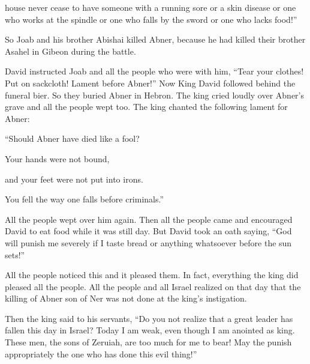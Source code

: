{house
never cease to have someone with
a running sore
or a skin disease
or one who works at the spindle
or one who falls
by the sword
or one who lacks
food!”
\par }{\PP {}So Joab
and his brother
Abishai
killed
Abner,
because
he had
killed
their brother
Asahel
in Gibeon
during the battle.
\par }{\PP {}David
instructed
Joab
and all
the people
who
were with
him, “Tear
your clothes! Put on
sackcloth! Lament
before
Abner!” Now King
David
followed
behind
the funeral bier.
So they buried
Abner
in Hebron.
The king
cried
loudly
over Abner’s
grave
and all
the people
wept too.
The king
chanted
the following lament for Abner:
\par }{\Q “Should Abner
have died
like a fool?
\par }{\Q {}Your hands
were not
bound,
\par }{\Q and your feet
were not
put into irons.
\par }{\Q You fell
the way one falls
before
criminals.”
\par }{\PP All
the people
wept
over him again.
Then all
the people
came
and encouraged
David
to eat food
while it was still
day.
But David
took an oath
saying,
“God
will punish
me severely
if
I taste
bread
or
anything
whatsoever
before
the sun
sets!”
\par }{\PP {}All
the people
noticed
this and it pleased
them. In fact, everything
the king
did
pleased
all
the people.
All
the people
and all
Israel
realized
on that day
that
the killing of Abner
son
of Ner
was not
done at the king’s
instigation.
\par }{\PP {}Then the king
said
to his servants,
“Do you not
realize
that
a great
leader
has fallen
this
day
in Israel?
Today
I am
weak,
even though I am anointed
as king.
These
men,
the sons
of Zeruiah,
are
too
much for me to bear! May the
{}
punish appropriately
the one who has done
this evil
thing!”

}
